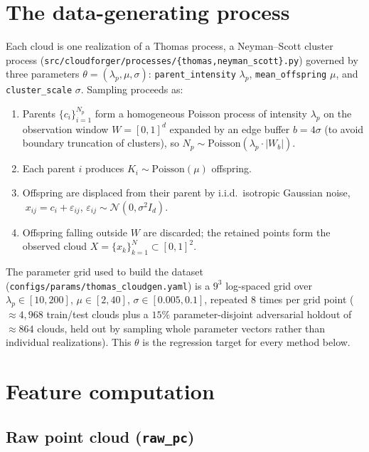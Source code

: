 \documentclass[11pt]{article}
\begin{document}
\section{The data-generating process}

Each cloud is one realization of a Thomas process, a Neyman--Scott cluster
process (\texttt{src/cloudforger/processes/\{thomas,neyman\_scott\}.py})
governed by three parameters $\theta = (\lambda_p, \mu, \sigma)$:
\texttt{parent\_intensity} $\lambda_p$, \texttt{mean\_offspring} $\mu$, and
\texttt{cluster\_scale} $\sigma$. Sampling proceeds as:
\begin{enumerate}
  \item Parents $\{c_i\}_{i=1}^{N_p}$ form a homogeneous Poisson process of
    intensity $\lambda_p$ on the observation window $W=[0,1]^d$ expanded by
    an edge buffer $b = 4\sigma$ (to avoid boundary truncation of clusters),
    so $N_p \sim \mathrm{Poisson}(\lambda_p \cdot |W_b|)$.
  \item Each parent $i$ produces $K_i \sim \mathrm{Poisson}(\mu)$ offspring.
  \item Offspring are displaced from their parent by i.i.d.\ isotropic
    Gaussian noise, $\;x_{ij} = c_i + \varepsilon_{ij}$,
    $\varepsilon_{ij} \sim \mathcal N(0, \sigma^2 I_d)$.
  \item Offspring falling outside $W$ are discarded; the retained points form
    the observed cloud $X=\{x_k\}_{k=1}^N \subset [0,1]^2$.
\end{enumerate}
The parameter grid used to build the dataset
(\texttt{configs/params/thomas\_cloudgen.yaml}) is a $9^3$ log-spaced grid
over $\lambda_p\in[10,200]$, $\mu\in[2,40]$, $\sigma\in[0.005,0.1]$, repeated
8 times per grid point ($\approx 4{,}968$ train/test clouds plus a $15\%$
parameter-disjoint adversarial holdout of $\approx 864$ clouds, held out by
sampling whole parameter vectors rather than individual realizations). This
$\theta$ is the regression target for every method below.

\section{Feature computation}

\subsection{Raw point cloud (\texttt{raw\_pc})}
\end{document}
